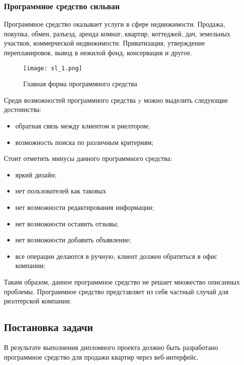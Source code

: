 \subsubsection{Программное средство сильван}

Программное средство оказывает услуги в сфере недвижимости. Продажа, покупка, обмен, разъезд, аренда комнат, квартир, коттеджей, дач, земельных участков, коммерческой недвижимости. Приватизация, утверждение перепланировок, вывод в нежилой фонд, консервация и другое.

\begin{figure}[!htb]
	\centering
	\texttt{[image: sl\_1.png]}
	\caption{ Главная форма программного средства}
	\label{fig:arch_and_mod::lexer_flow}
	\clearpage
\end{figure}

Среди возможностей программного средства y можно выделить следующие достоинства:

\begin{itemize}
	\item обратная связь между клиентом и риелтором;
	\item возможность поиска по различным критериям;
\end{itemize}

Стоит отметить минусы данного программного средства:

\begin{itemize}
	\item яркий дизайн;
	\item нет пользователей как таковых
	\item нет возможности редактирования информации;
	\item нет возможности оставить отзывы;
	\item нет возможности добавить объявление;
	\item все операции делаются в ручную, клиент должен обратиться в офис компании;
\end{itemize}

Таким образом, данное программное средство не решает  множество описанных проблемы. Программное средство представляет из себя частный случай для риэлтерской компании.

\subsection{Постановка задачи}
В результате выполнения дипломного проекта должно быть разработано программное средство для продажи квартир через веб-интерфейс. 

